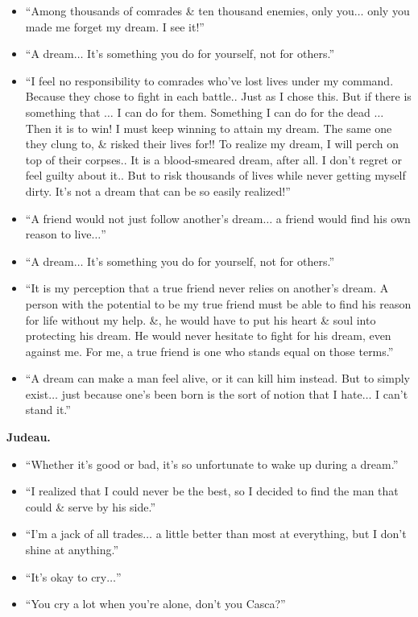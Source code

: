 \documentclass{article}
\begin{document}
\begin{enumerate}
\begin{itemize}
		\item ``Among thousands of comrades \& ten thousand enemies, only you$\ldots$ only you made me forget my dream. I see it!''
		\item ``A dream$\ldots$ It's something you do for yourself, not for others.''
		\item ``I feel no responsibility to comrades who've lost lives under my command. Because they chose to fight in each battle.. Just as I chose this. But if there is something that $\ldots$  I can do for them. Something I can do for the dead $\ldots$  Then it is to win! I must keep winning to attain my dream. The same one they clung to, \& risked their lives for!! To realize my dream, I will perch on top of their corpses.. It is a blood-smeared dream, after all. I don't regret or feel guilty about it.. But to risk thousands of lives while never getting myself dirty. It's not a dream that can be so easily realized!''
		\item ``A friend would not just follow another's dream$\ldots$ a friend would find his own reason to live$\ldots$''
		\item ``A dream$\ldots$ It's something you do for yourself, not for others.''
		\item ``It is my perception that a true friend never relies on another's dream. A person with the potential to be my true friend must be able to find his reason for life without my help. \&, he would have to put his heart \& soul into protecting his dream. He would never hesitate to fight for his dream, even against me. For me, a true friend is one who stands equal on those terms.''
		\item ``A dream can make a man feel alive, or it can kill him instead. But to simply exist$\ldots$ just because one's been born is the sort of notion that I hate$\ldots$ I can't stand it.''
	\end{itemize}
	{\bf Judeau.}
	\begin{itemize}
		\item ``Whether it's good or bad, it's so unfortunate to wake up during a dream.''
		\item ``I realized that I could never be the best, so I decided to find the man that could \& serve by his side.''
		\item ``I'm a jack of all trades$\ldots$ a little better than most at everything, but I don't shine at anything.''
		\item ``It's okay to cry$\ldots$''
		\item ``You cry a lot when you're alone, don't you Casca?''

\end{itemize}
\end{enumerate}
\end{document}
